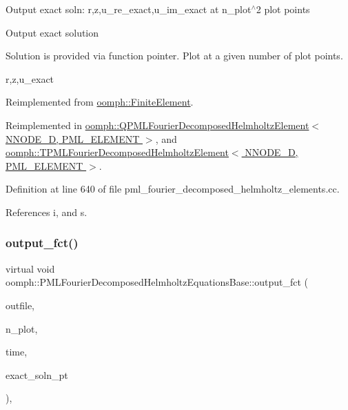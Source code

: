 Output exact soln\+: r,z,u\+\_\+re\+\_\+exact,u\+\_\+im\+\_\+exact at n\+\_\+plot$^\wedge$2 plot points

Output exact solution

Solution is provided via function pointer. Plot at a given number of plot points.

r,z,u\+\_\+exact 

Reimplemented from \hyperlink{classoomph_1_1FiniteElement_a22b695c714f60ee6cd145be348042035}{oomph\+::\+Finite\+Element}.



Reimplemented in \hyperlink{classoomph_1_1QPMLFourierDecomposedHelmholtzElement_a502b29e718eed748e36e28a5b5a229f0}{oomph\+::\+Q\+P\+M\+L\+Fourier\+Decomposed\+Helmholtz\+Element$<$ N\+N\+O\+D\+E\+\_\+D, P\+M\+L\+\_\+\+E\+L\+E\+M\+E\+N\+T $>$}, and \hyperlink{classoomph_1_1TPMLFourierDecomposedHelmholtzElement_a8d10df8873643287fa87842e34e3b898}{oomph\+::\+T\+P\+M\+L\+Fourier\+Decomposed\+Helmholtz\+Element$<$ N\+N\+O\+D\+E\+\_\+D, P\+M\+L\+\_\+\+E\+L\+E\+M\+E\+N\+T $>$}.



Definition at line 640 of file pml\+\_\+fourier\+\_\+decomposed\+\_\+helmholtz\+\_\+elements.\+cc.



References i, and s.

\mbox{\label{classoomph_1_1PMLFourierDecomposedHelmholtzEquationsBase_acde47c8580702187e2663c08c243e126}} 
\subsubsection{\texorpdfstring{output\+\_\+fct()}{output\_fct()}\hspace{0.1cm}{\footnotesize\ttfamily [2/2]}}
{\footnotesize\ttfamily virtual void oomph\+::\+P\+M\+L\+Fourier\+Decomposed\+Helmholtz\+Equations\+Base\+::output\+\_\+fct (\begin{DoxyParamCaption}\item[{std\+::ostream \&}]{outfile,  }\item[{const unsigned \&}]{n\+\_\+plot,  }\item[{const double \&}]{time,  }\item[{\hyperlink{classoomph_1_1FiniteElement_ad4ecf2b61b158a4b4d351a60d23c633e}{Finite\+Element\+::\+Unsteady\+Exact\+Solution\+Fct\+Pt}}]{exact\+\_\+soln\+\_\+pt }\end{DoxyParamCaption})\hspace{0.3cm}{\ttfamily [inline]}, {\ttfamily [virtual]}}



